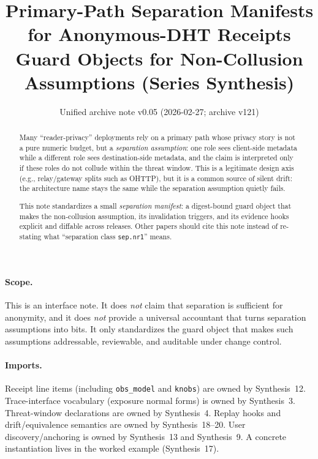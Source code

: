 \documentclass[11pt]{article}
\title{Primary-Path Separation Manifests for Anonymous-DHT Receipts\\
\large Guard Objects for Non-Collusion Assumptions (Series Synthesis)}
\author{}
\date{Unified archive note v0.05 (2026-02-27; archive v121)}
\begin{document}
\maketitle

\begin{abstract}
Many ``reader-privacy'' deployments rely on a primary path whose privacy story is not a pure numeric budget, but a \emph{separation assumption}: one role sees client-side metadata while a different role sees destination-side metadata, and the claim is interpreted only if these roles do not collude within the threat window.
This is a legitimate design axis (e.g., relay/gateway splits such as OHTTP\cite{rfc9458OHTTP}), but it is a common source of silent drift: the architecture name stays the same while the separation assumption quietly fails.

This note standardizes a small \emph{separation manifest}: a digest-bound guard object that makes the non-collusion assumption, its invalidation triggers, and its evidence hooks explicit and diffable across releases.
Other papers should cite this note instead of re-stating what ``separation class \texttt{sep.nr1}'' means.
\end{abstract}

\paragraph{Scope.}
This is an interface note.
It does \emph{not} claim that separation is sufficient for anonymity, and it does \emph{not} provide a universal accountant that turns separation assumptions into bits.
It only standardizes the guard object that makes such assumptions addressable, reviewable, and auditable under change control.

\paragraph{Imports.}
Receipt line items (including \texttt{obs\_model} and \texttt{knobs}) are owned by Synthesis~12.\cite{series:receiptitems}
Trace-interface vocabulary (exposure normal forms) is owned by Synthesis~3.\cite{series:traceifaces}
Threat-window declarations are owned by Synthesis~4.\cite{series:threatwindows}
Replay hooks and drift/equivalence semantics are owned by Synthesis~18--20.\cite{series:planstateequiv,series:auditorreplay}
User discovery/anchoring is owned by Synthesis~13 and Synthesis~9.\cite{series:userminiface,series:transparencyprimitives}
A concrete instantiation lives in the worked example (Synthesis~17).\cite{series:workedexample}
\end{document}
